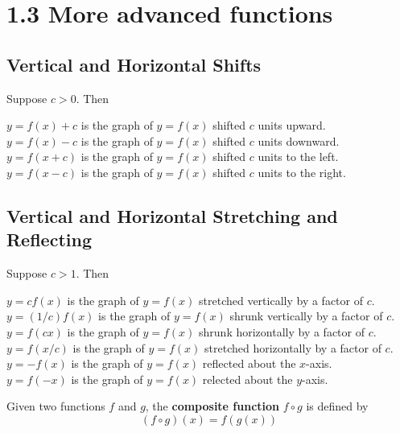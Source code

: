 %
%

\section*{1.3 More advanced functions}

\subsection*{Vertical and Horizontal Shifts}

Suppose \(c>0\). Then
\begin{center}
\(y=f(x)+c\) is the graph of \(y=f(x)\) shifted \(c\) units upward.\\
\(y=f(x)-c\) is the graph of \(y=f(x)\) shifted \(c\) units downward.\\
\(y=f(x+c)\) is the graph of \(y=f(x)\) shifted \(c\) units to the left.\\
\(y=f(x-c)\) is the graph of \(y=f(x)\) shifted \(c\) units to the right.\\
\end{center}

\subsection*{Vertical and Horizontal Stretching and Reflecting}

Suppose \(c>1\). Then
\begin{center}
\(y=cf(x)\) is the graph of \(y=f(x)\) stretched vertically by a factor of \(c\).\\
\(y=(1/c)f(x)\) is the graph of \(y=f(x)\) shrunk vertically by a factor of \(c\).\\
\(y=f(cx)\) is the graph of \(y=f(x)\) shrunk horizontally by a factor of \(c\).\\
\(y=f(x/c)\) is the graph of \(y=f(x)\) stretched horizontally by a factor of \(c\).\\
\(y=-f(x)\) is the graph of \(y=f(x)\) reflected about the \(x\)-axis.\\
\(y=f(-x)\) is the graph of \(y=f(x)\) relected about the \(y\)-axis.
\end{center}
Given two functions \(f\) and \(g\), the \textbf{composite function} \(f \circ g\) is defined by 
$$(f \circ g)(x)=f(g(x))$$
